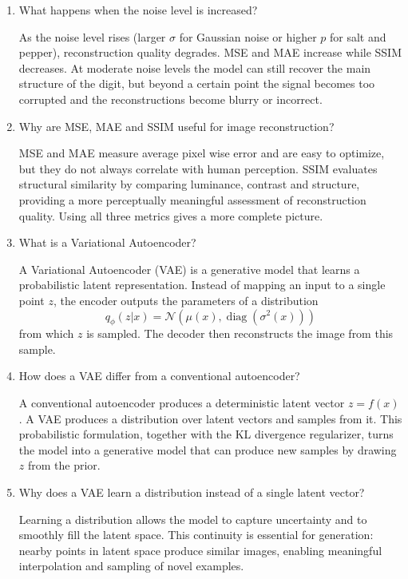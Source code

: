 \documentclass[10pt]{article}
\begin{document}
\begin{enumerate}
\item What happens when the noise level is increased?

As the noise level rises (larger \(\sigma\) for Gaussian noise or higher \(p\) for salt and pepper), reconstruction quality degrades. MSE and MAE increase while SSIM decreases. At moderate noise levels the model can still recover the main structure of the digit, but beyond a certain point the signal becomes too corrupted and the reconstructions become blurry or incorrect.\\

\item Why are MSE, MAE and SSIM useful for image reconstruction?

MSE and MAE measure average pixel wise error and are easy to optimize, but they do not always correlate with human perception. SSIM evaluates structural similarity by comparing luminance, contrast and structure, providing a more perceptually meaningful assessment of reconstruction quality. Using all three metrics gives a more complete picture.\\

\item What is a Variational Autoencoder?

A Variational Autoencoder (VAE) is a generative model that learns a probabilistic latent representation. Instead of mapping an input to a single point \(z\), the encoder outputs the parameters of a distribution
\[
q_\phi(z|x) = \mathcal{N}(\mu(x), \operatorname{diag}(\sigma^2(x)))
\]
from which \(z\) is sampled. The decoder then reconstructs the image from this sample.\\

\item How does a VAE differ from a conventional autoencoder?

A conventional autoencoder produces a deterministic latent vector \(z = f(x)\). A VAE produces a distribution over latent vectors and samples from it. This probabilistic formulation, together with the KL divergence regularizer, turns the model into a generative model that can produce new samples by drawing \(z\) from the prior.\\

\item Why does a VAE learn a distribution instead of a single latent vector?

Learning a distribution allows the model to capture uncertainty and to smoothly fill the latent space. This continuity is essential for generation: nearby points in latent space produce similar images, enabling meaningful interpolation and sampling of novel examples.\\


\end{enumerate}
\end{document}
